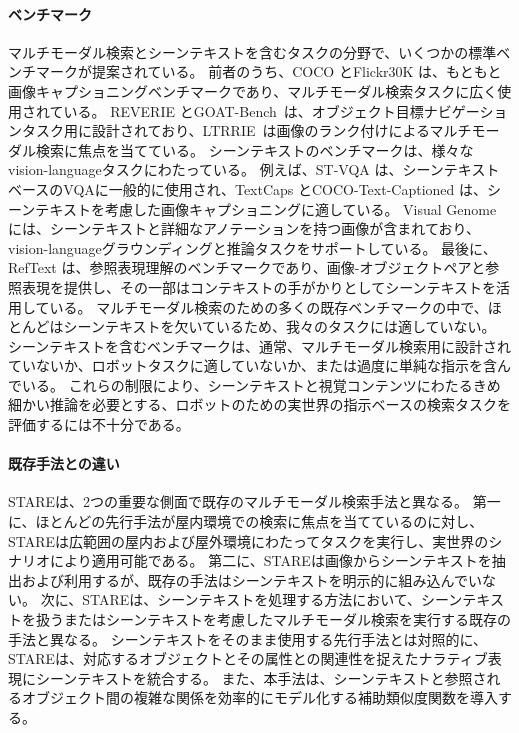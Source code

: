 \paragraph{ベンチマーク}
マルチモーダル検索とシーンテキストを含むタスクの分野で、いくつかの標準ベンチマークが提案されている。
前者のうち、COCO \cite{Lin2014MicrosoftCC}とFlickr30K \cite{flickr30k}は、もともと画像キャプショニングベンチマークであり、マルチモーダル検索タスクに広く使用されている。
REVERIE \cite{qi2020reverie}とGOAT-Bench~\cite{khanna2024goatbench}は、オブジェクト目標ナビゲーションタスク用に設計されており、LTRRIE~\cite{multirankit}は画像のランク付けによるマルチモーダル検索に焦点を当てている。
シーンテキストのベンチマークは、様々なvision-languageタスクにわたっている。
例えば、ST-VQA \cite{stvqa}は、シーンテキストベースのVQAに一般的に使用され、TextCaps \cite{textcaps}とCOCO-Text-Captioned \cite{stacmr}は、シーンテキストを考慮した画像キャプショニングに適している。
Visual Genome \cite{Krishna2017}には、シーンテキストと詳細なアノテーションを持つ画像が含まれており、vision-languageグラウンディングと推論タスクをサポートしている。
最後に、RefText \cite{stan}は、参照表現理解のベンチマークであり、画像-オブジェクトペアと参照表現を提供し、その一部はコンテキストの手がかりとしてシーンテキストを活用している。
マルチモーダル検索のための多くの既存ベンチマークの中で、ほとんどはシーンテキストを欠いているため、我々のタスクには適していない。
シーンテキストを含むベンチマークは、通常、マルチモーダル検索用に設計されていないか、ロボットタスクに適していないか、または過度に単純な指示を含んでいる。
これらの制限により、シーンテキストと視覚コンテンツにわたるきめ細かい推論を必要とする、ロボットのための実世界の指示ベースの検索タスクを評価するには不十分である。

\paragraph{既存手法との違い}
STAREは、2つの重要な側面で既存のマルチモーダル検索手法と異なる。
第一に、ほとんどの先行手法が屋内環境での検索に焦点を当てているのに対し、STAREは広範囲の屋内および屋外環境にわたってタスクを実行し、実世界のシナリオにより適用可能である。
第二に、STAREは画像からシーンテキストを抽出および利用するが、既存の手法はシーンテキストを明示的に組み込んでいない。
次に、STAREは、シーンテキストを処理する方法において、シーンテキストを扱うまたはシーンテキストを考慮したマルチモーダル検索を実行する既存の手法と異なる。
シーンテキストをそのまま使用する先行手法とは対照的に、STAREは、対応するオブジェクトとその属性との関連性を捉えたナラティブ表現にシーンテキストを統合する。
また、本手法は、シーンテキストと参照されるオブジェクト間の複雑な関係を効率的にモデル化する補助類似度関数を導入する。
